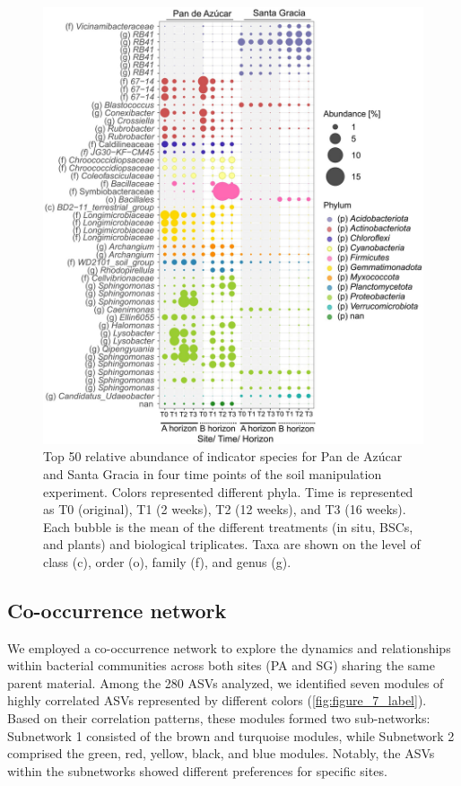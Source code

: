 \begin{figure}[H]
	\centering
	\includegraphics[width=1\textwidth]{img/M3-Figure_6.jpg}
	\caption{Top 50 relative abundance of indicator species for Pan de Azúcar and Santa Gracia in four time points of the soil manipulation experiment. Colors represented different phyla. Time is represented as T0 (original), T1 (2 weeks), T2 (12 weeks), and T3 (16 weeks). Each bubble is the mean of the different treatments (in situ, BSCs, and plants) and biological triplicates. Taxa are shown on the level of class (c), order (o), family (f), and genus (g).}
	\label{fig:M3-F6}
\end{figure}

\subsection{Co-occurrence network}

We employed a co-occurrence network to explore the dynamics and relationships within bacterial communities across both sites (PA and SG) sharing the same parent material. 
Among the \num{280} ASVs analyzed, we identified seven modules of highly correlated ASVs represented by different colors (\cref{fig:figure_7_label}). 
Based on their correlation patterns, these modules formed two sub-networks: Subnetwork 1 consisted of the brown and turquoise modules, while Subnetwork 2 comprised the green, red, yellow, black, and blue modules. 
Notably, the ASVs within the subnetworks showed different preferences for specific sites. 

